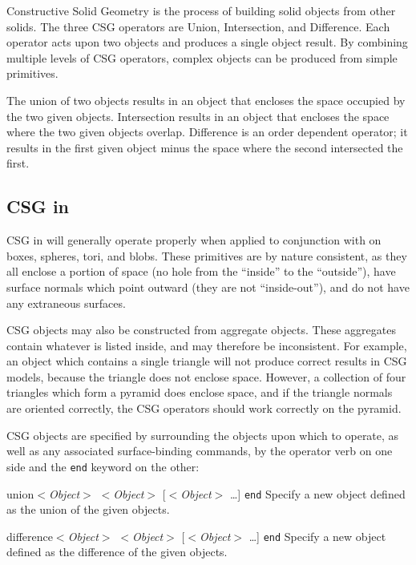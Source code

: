Constructive Solid Geometry is
the process of building solid objects from other solids.
The three CSG
operators are Union, Intersection, and Difference.  Each operator
acts upon two objects and produces a single object result.
By combining multiple levels of CSG operators, complex
objects can be produced from simple primitives.

The union of two objects results in an
object that encloses the space occupied by the two given objects.
Intersection results in an object that encloses the space where the two
given objects overlap.  Difference is an order dependent operator; it
results in the
first given object minus the space where the second intersected
the first.

\subsection{CSG in {\Rayshade}}

CSG in {\rayshade} will generally operate properly when applied to
conjunction with
on boxes, spheres,
tori, and blobs.
These primitives are by nature consistent, as they all
enclose a portion of space (no hole from the ``inside'' to the
``outside''), have surface normals which point outward (they
are not ``inside-out''), and do not have any extraneous surfaces.

CSG objects may also be constructed from aggregate objects.
These aggregates contain
whatever is listed inside, and may therefore be inconsistent.
For example, an object which contains a single triangle will not
produce correct results in CSG models, because the triangle does not enclose
space.  However, a collection of four triangles which form a pyramid
does enclose space, and if the triangle normals
are oriented correctly,
the CSG operators should work correctly on the pyramid.

CSG objects are specified by surrounding the objects upon
which to operate, as well as any associated surface-binding commands,
by the operator verb on one side and the {\tt end}
keyword on the other:

\begin{defkey}{union}{$<${\em Object}$>$ $<${\em Object}$>$
[$<${\em Object}$>$ \ldots] {\tt end}}
	Specify a new object defined as the union of the
	given objects.
\end{defkey}

\begin{defkey}{difference}{$<${\em Object}$>$ $<${\em Object}$>$ 
[$<${\em Object}$>$ \ldots] {\tt end}}
	Specify a new object defined as the difference of the
	given objects.
\end{defkey}

